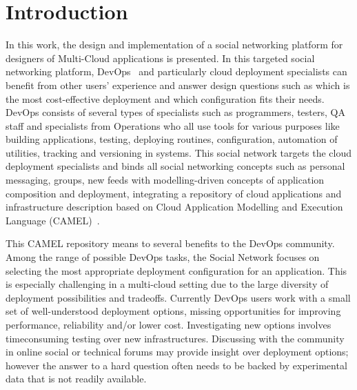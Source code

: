 \chapter{Introduction}
In this work, the design and implementation of a social networking platform for designers of Multi-Cloud applications is presented. In this targeted social networking platform, DevOps~\cite{loukides2012devops} and particularly cloud deployment specialists can benefit from other users' experience and answer design questions such as which is the most cost-effective deployment and which configuration fits their needs.  DevOps consists of several types of specialists such as programmers, testers, QA staff and specialists from Operations who all use tools for various purposes like building applications, testing, deploying routines, configuration, automation of utilities, tracking and versioning in systems.  This social network targets the cloud deployment specialists and binds all social networking concepts such as personal messaging, groups, new feeds with modelling-driven concepts of application composition and deployment, integrating a repository of cloud applications and infrastructure description based on Cloud Application Modelling and Execution Language (CAMEL)~\cite{paasagedeliverable212}. 

This CAMEL repository means to several benefits to the DevOps community.
Among the range of possible DevOps tasks, the Social Network focuses on selecting the most appropriate deployment
configuration for an application. This is especially challenging in a multi-cloud setting due to the
large diversity of deployment possibilities and tradeoffs. Currently DevOps users work with a small set of
well-understood deployment options, missing opportunities for improving performance, reliability and/or
lower cost. Investigating new options involves timeconsuming testing over new infrastructures. Discussing
with the community in online social or technical forums may provide insight over deployment options;
however the answer to a hard question often needs to be backed by experimental data that is not readily
available. 


